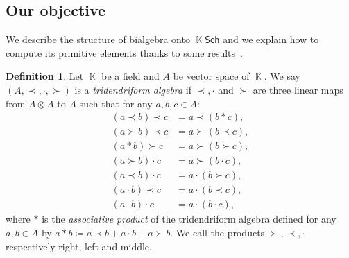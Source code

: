 \documentclass[a4paper,10pt]{amsart}
\DeclareMathOperator{\K}{\mathbb{K}}
\newcommand\Sch{\mathsf{Sch}}
\theoremstyle{definition}
\newtheorem{defi}{Definition}
\begin{document}
\subsection{Our objective}

We describe the structure of bialgebra onto $\K\Sch$ and we explain how to compute its primitive elements thanks to some results~\cite{Catoire_2023,euleridem}.

\begin{defi}\label{def:tridend}
	Let $\K$ be a field and $A$ be vector space of $\K$. We say $(A,\prec,\cdot,\succ)$ is a \emph{tridendriform algebra} if $\prec,\cdot$ and $\succ$ are three linear maps from $A\otimes A$ to $A$ such that for any $a,b,c\in A$:
	\begin{align}
		(a\prec b)\prec c&=a\prec(b*c), \label{eq:tri1}\\
		(a\succ b)\prec c&=a\succ(b\prec c), \label{eq:tri2} \\
		(a* b)\succ c&=a\succ(b\succ c),  \label{eq:tri3} \\
		(a\succ b)\cdot c&=a\succ(b\cdot c), \label{eq:tri4} \\
		(a\prec b)\cdot c&=a\cdot(b\succ c), \label{eq:tri5} \\
		(a\cdot b)\prec c&=a\cdot(b\prec c), \label{eq:tri6} \\
		(a\cdot b)\cdot c&=a\cdot (b\cdot c), \label{eq:tri7}
	\end{align}
	where $*$ is the \emph{associative product} of the tridendriform algebra defined for any $a,b\in A$ by $a*b\coloneqq a\prec b + a\cdot b +a\succ b$. 
	We call the products $\succ,\prec,\cdot$ respectively right, left and middle.
\end{defi} 
\end{document}
